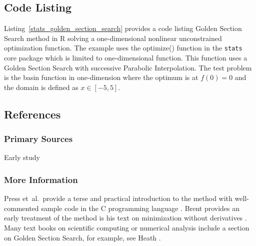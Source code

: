 \subsection{Code Listing}
Listing~\ref{stats_golden_section_search} provides a code listing Golden Section Search method in R solving a one-dimensional nonlinear unconstrained optimization function.
The example uses the {optimize()} function in the \texttt{stats} core package which is limited to one-dimensional function. This function uses a Golden Section Search with successive Parabolic Interpolation. 
The test problem is the basin function in one-dimension where the optimum is at $f(0)=0$ and the domain is defined as $x \in [-5,5]$. 



\subsection{References}

\subsubsection{Primary Sources}

Early study \cite{Overholt1965}


\subsubsection{More Information}
Press et~al.\ provide a terse and practical introduction to the method with well-commented sample code in the C programming language \cite{Press2007}.
Brent provides an early treatment of the method is his text on minimization without derivatives \cite{Brent1973}.
Many text books on scientific computing or numerical analysis include a section on Golden Section Search, for example, see Heath \cite{Heath2002}.

